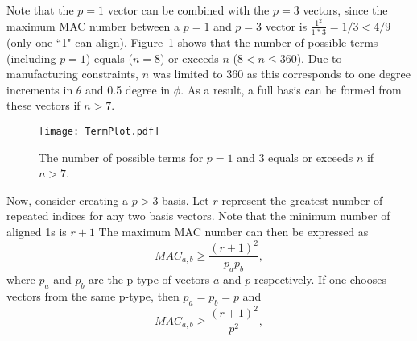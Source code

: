 \documentclass[3p,times]{elsarticle}
\begin{document}
Note that the $p=1$ vector can be combined with the $p=3$ vectors, since the maximum MAC number between a $p=1$ and $p=3$ vector is $\frac{1^2}{1*3}=1/3 < 4/9$ (only one ``1" can align).  Figure~\ref{fig:terms} shows that the number of possible terms (including $p=1$) equals ($n=8$) or exceeds $n$ ($8<n\le 360$).  Due to manufacturing constraints, $n$ was limited to 360 as this corresponds to one degree increments in $\theta$ and 0.5 degree in $\phi$.  As a result, a full basis can be formed from these vectors if $n>7$.
\begin{figure}[ht!]
\texttt{[image: TermPlot.pdf]}
\centering
\caption{The number of possible terms for $p=1$ and 3 equals or exceeds $n$ if $n>7$.}
\label{fig:terms}
\end{figure}

Now, consider creating a $p>3$ basis.  Let $r$ represent the greatest number of repeated indices for any two basis vectors.  Note that the minimum number of aligned 1s is $r+1$
The maximum MAC number can then be expressed as
\begin{equation}
MAC_{a,b}\ge\frac{\left(r+1\right)^2}{p_a p_b},
\end{equation}
where $p_a$ and $p_b$ are the p-type of vectors $a$ and $p$ respectively.  If one chooses vectors from the same p-type, then $p_a=p_b=p$ and
\begin{equation}
MAC_{a,b}\ge\frac{\left(r+1\right)^2}{p^2},
\end{equation}


\end{document}

